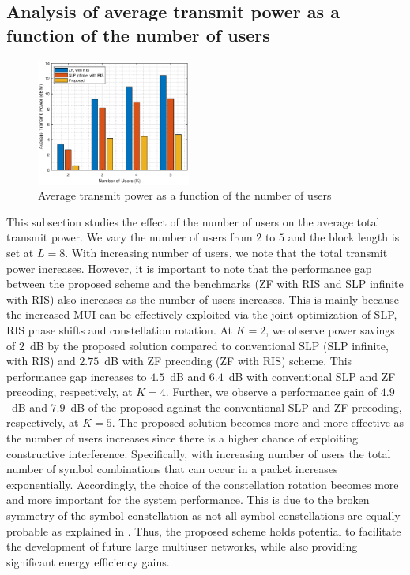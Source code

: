 \documentclass[10pt,conference]{IEEEtran}
\begin{document}
\subsection{Analysis of average transmit power as a function of the number of users}
\begin{figure}[h!]
	\centering	\includegraphics[width=0.45\textwidth]{Images/with5usersfig.eps}
	\caption{Average transmit power as a function of the number of users}
	\label{fig:C}
\end{figure}
This subsection studies the effect of the number of users on the average total transmit power. We vary the number of users from $2$ to $5$ and the block length is set at $L=8$. With increasing number of users, we note that the total transmit power increases. However, it is important to note that the performance gap between the proposed scheme and the benchmarks (ZF with RIS and SLP infinite with RIS) also increases as the number of users increases. This is mainly because the increased MUI  can be effectively exploited via the joint optimization of SLP, RIS phase shifts and constellation rotation. At $K=2$, we observe power savings of $2$~dB by the proposed solution compared to  conventional SLP (SLP infinite, with RIS) and $2.75$~dB with ZF precoding (ZF with RIS) scheme. This performance gap increases to $4.5$~dB and $6.4$~dB with conventional SLP and ZF precoding, respectively, at $K=4$. Further, we observe a performance gain of $4.9$~dB and $7.9$~dB of the proposed against the conventional SLP and ZF precoding, respectively, at $K=5$. The proposed solution becomes more and more effective as the number of users increases since there is a higher chance of exploiting constructive interference. Specifically, with increasing number of users the total number of symbol combinations that can occur in a packet increases exponentially. Accordingly, the choice of the constellation rotation becomes more and more important for the system performance. This is due to the broken symmetry of the symbol constellation as not all symbol constellations are equally probable as explained in \cite{kisseleff2021symbol}. Thus, the proposed scheme holds potential to facilitate the development of future large multiuser networks, while also providing significant energy efficiency gains.
\end{document}
